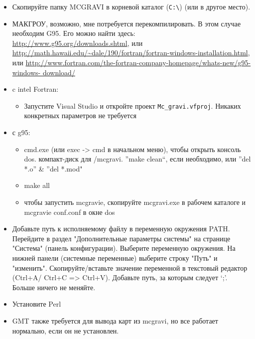 \begin{itemize}
    \item Скопируйте папку MCGRAVI в корневой каталог (\verb|C:\|) (или в другое место).

    \item МАКГРОУ, возможно, мне потребуется перекомпилировать. В этом случае
    необходим G95. Его можно найти здесь:
    \url{http://www.g95.org/downloads.shtml}, или
    \url{http://math.hawaii.edu/~dale/190/fortran/fortran-windows-installation.html}, или
    \url{http://www.fortran.com/the-fortran-company-homepage/whats-new/g95-windows-
    download/}

    \item c intel Fortran:
    \begin{itemize}
        \item Запустите Visual Studio и откройте проект \verb|Mc_gravi.vfproj|.
        Никаких конкретных параметров не требуется
        
    \end{itemize}

    \item с g95:
    \begin{itemize}
        \item cmd.exe (или exec -> cmd в начальном меню), чтобы открыть
        консоль dos. компакт-диск для /mcgravi. ”make clean“, если необходимо,
        или ”del *.o” \& ”del *.mod"

        \item make all
        
        \item чтобы запустить mcgravie, скопируйте mcgravi.exe в рабочем каталоге и mcgravie conf.conf в окне dos
        
    \end{itemize}

    \item Добавьте путь к исполняемому файлу в переменную окружения PATH.
    Перейдите в раздел "Дополнительные параметры системы" на странице "Система"
    (панель конфигурации). Выберите переменную окружения. На нижней панели
    (системные переменные) выберите строку "Путь" и "изменить".
    Скопируйте/вставьте значение переменной в текстовый редактор (Ctrl+A/ Ctrl+C
    => Ctrl+V). Добавьте путь, за которым следует ‘;’. Больше ничего не меняйте.

    \item Установите Perl
    
    \item GMT также требуется для вывода карт из mcgravi, но все работает
    нормально, если он не установлен.
    
\end{itemize}
